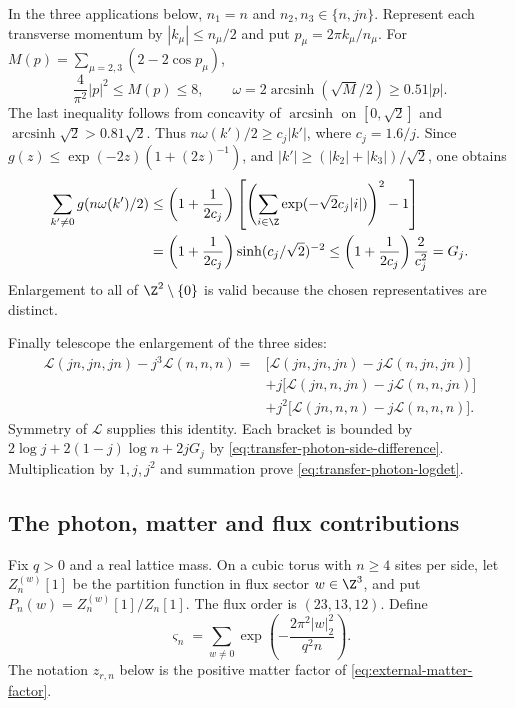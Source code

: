 In the three applications below, $n_1=n$ and
$n_2,n_3\in\{n,jn\}$. Represent each transverse momentum by
$|k_\mu|\le n_\mu/2$ and put $p_\mu=2\pi k_\mu/n_\mu$.
For
$M(p)=\sum_{\mu=2,3}(2-2\cos p_\mu)$,
\[
 \frac4{\pi^2}|p|^2\le M(p)\le8,\qquad
 \omega=2\operatorname{arcsinh}(\sqrt M/2)\ge0.51|p|.
\]
The last inequality follows from concavity of
$\operatorname{arcsinh}$ on $[0,\sqrt2]$ and
$\operatorname{arcsinh}\sqrt2>0.81\sqrt2$.
Thus $n\omega(k')/2\ge c_j|k'|$, where $c_j=1.6/j$.
Since
$g(z)\le\exp(-2z)(1+(2z)^{-1})$, and
$|k'|\ge(|k_2|+|k_3|)/\sqrt2$, one obtains
\begin{align*}
 \sum_{k'\ne0}g(n\omega(k')/2)
 &\le\left(1+\frac1{2c_j}\right)
   \left[
     \left(\sum_{i\in\Z}\exp(-\sqrt2c_j|i|)\right)^2-1
   \right]\\
 &=\left(1+\frac1{2c_j}\right)
                  \sinh(c_j/\sqrt2)^{-2}
 \le\left(1+\frac1{2c_j}\right)\frac2{c_j^2}
 =G_j.
\end{align*}
Enlargement to all of $\Z^2\setminus\{0\}$ is valid because
the chosen representatives are distinct.

Finally telescope the enlargement of the three sides:
\begin{align*}
 \mathcal L(jn,jn,jn)-j^3\mathcal L(n,n,n)
 ={}&\bigl[\mathcal L(jn,jn,jn)-j\mathcal L(n,jn,jn)\bigr]\\
 &+j\bigl[\mathcal L(jn,n,jn)-j\mathcal L(n,n,jn)\bigr]\\
 &+j^2\bigl[\mathcal L(jn,n,n)-j\mathcal L(n,n,n)\bigr].
\end{align*}
Symmetry of $\mathcal L$ supplies this identity.
Each bracket is bounded by
$2\log j+2(1-j)\log n+2jG_j$ by
\eqref{eq:transfer-photon-side-difference}.
Multiplication by $1,j,j^2$ and summation prove
\eqref{eq:transfer-photon-logdet}.

\subsection{The photon, matter and flux contributions}

Fix $q>0$ and a real lattice mass. On a cubic torus with
$n\ge4$ sites per side, let $Z_n^{(w)}[1]$ be the
partition function in flux sector $w\in\Z^3$, and put
$P_n(w)=Z_n^{(w)}[1]/Z_n[1]$. The flux order is
$(23,13,12)$. Define
\begin{equation}\label{eq:transfer-flux-tail}
 \varsigma_n=\sum_{w\ne0}
              \exp\left(-\frac{2\pi^2|w|_2^2}{q^2n}\right).
\end{equation}
The notation $z_{r,n}$ below is the positive matter factor
of \eqref{eq:external-matter-factor}.

